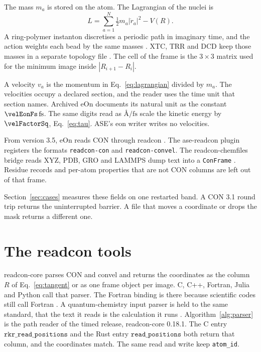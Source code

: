 The mass \(m_a\) is stored on the atom.
The Lagrangian of the nuclei is
\begin{equation}
\label{eq:lagrangian}
L=\sum_{a=1}^{N}\tfrac12 m_a|\dot r_a|^{2}-V(R).
\end{equation}
A ring-polymer instanton discretises a periodic path in imaginary time, and the action weights each bead by the same masses
\cite{richardsonRingpolymerInstanton2018}.
XTC, TRR and DCD keep those masses in a separate topology file
\cite{abrahamGromacsHighPerformance2015,brooksCharmmBiomolecularSimulation2009}.
The cell of the frame is the \(3\times 3\) matrix used for the minimum image inside \(|R_{i+1}-R_i|\).

A velocity \(v_a\) is the momentum in Eq.~\eqref{eq:lagrangian} divided by \(m_a\).
The velocities occupy a declared section, and the reader uses the time unit that section names.
Archived eOn documents its natural unit as the constant \(\velEonFs\,\mathrm{fs}\).
The same digits read as \(\text{\AA}/\mathrm{fs}\) scale the kinetic energy by \(\velFactorSq\), Eq.~\eqref{eq:tau}.
ASE's eon writer writes no velocities.

From version 3.5, eOn reads CON through readcon
\cite{chillEonSoftwareLong2014,rohitgoswamiTheochemuieonV3602026}.
The ase-readcon plugin registers the formats \texttt{readcon-con} and \texttt{readcon-convel}.
The readcon-chemfiles bridge reads XYZ, PDB, GRO and LAMMPS dump text into a \texttt{ConFrame}
\cite{frauxChemfileschemfilesVersion01042023}.
Residue records and per-atom properties that are not CON columns are left out of that frame.

Section~\ref{sec:cases} measures these fields on one restarted band.
A CON 3.1 round trip returns the uninterrupted barrier.
A file that moves a coordinate or drops the mask returns a different one.

\section{The readcon tools}\label{sec:ecosystem}
readcon-core parses CON and convel and returns the coordinates as the column \(R\) of Eq.~\eqref{eq:tangent} or as one frame object per image.
C, C++, Fortran, Julia and Python call that parser.
The Fortran binding is there because scientific codes still call Fortran
\cite{kedwardStateFortran2022}.
A quantum-chemistry input parser is held to the same standard, that the text it reads is the calculation it runs
\cite{goswamiWailordParsers2022}.
Algorithm~\ref{alg:parser} is the path reader of the timed release, readcon-core 0.18.1.
The C entry \(\texttt{rkr\_read\_positions}\) and the Rust entry \(\texttt{read\_positions}\) both return that column, and the coordinates match.
The same read and write keep \texttt{atom\_id}.

